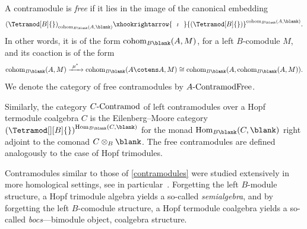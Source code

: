 A contramodule is \emph{free} if it lies in the image of the canonical embedding
\[
  {(\Tetramod[B]{})}_{\mathrm{cohom}_{B\blank}(A,\blank)} \xhookrightarrow{\ \ \iota\ \ } {(\Tetramod[B]{})}^{\mathrm{cohom}_{B\blank}(A,\blank)}.
\]
In other words, it is of the form \(\mathrm{cohom}_{B\blank}(A,M)\),
for a left \(B\)\hyp{}comodule \(M\),
and its coaction is of the form
\[
  \mathrm{cohom}_{B\blank}(A,M)
  \xrightarrow{\ \mu^{*}\ } \mathrm{cohom}_{B\blank}(A \cotens A, M)
  \cong \mathrm{cohom}_{B\blank}(A, \mathrm{cohom}_{B\blank}(A, M)).
\]
We denote the category of free contramodules by \(A\textnormal{-ContramodFree}\).

Similarly, the category \(C\textnormal{-Contramod}\) of left contramodules over a Hopf termodule coalgebra \(C\) is
the Eilenberg--Moore category \({(\Tetramod[][B]{})}^{\mathrm{Hom}_{B\blank}(C,\blank)}\)
for the monad \(\mathrm{Hom}_{B\blank}(C,\blank)\) right adjoint to the comonad \(C \otimes_{B} \blank\).
The free contramodules are defined analogously to the case of Hopf trimodules.

\begin{remark}
  Contramodules similar to those of \cref{contramodules} were studied extensively in more homological settings,
  see in particular~\cite{positselski10:homol}.
  Forgetting the left \(B\)\hyp{}module structure,
  a Hopf trimodule algebra yields a so-called \emph{semialgebra},
  and by forgetting the left \(B\)\hyp{}comodule structure,
  a Hopf termodule coalgebra yields a so-called \emph{bocs}—bimodule object, coalgebra structure.
\end{remark}

